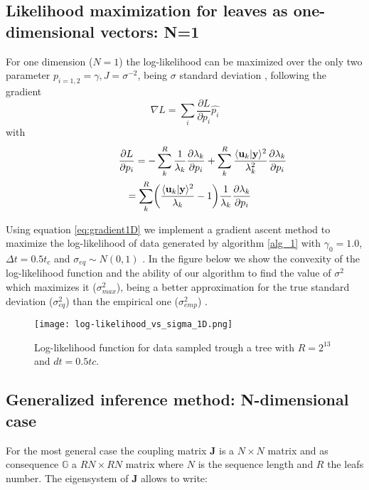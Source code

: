 \documentclass[reprint,amsmath,amssymb,superscriptaddress,showpacs,pre]{revtex4-1}
\let\originalleft\left
\let\originalright\right
\renewcommand{\left}{\mathopen{}\mathclose\bgroup\originalleft}
\renewcommand{\right}{\aftergroup\egroup\originalright}
\begin{document}
\subsection{Likelihood maximization for leaves as  one-dimensional  vectors: N=1}

For one dimension ($N=1$) the log-likelihood can be maximized over the only two parameter  $p_{i=1,2}=\gamma , J = \sigma^{-2}$, being $\sigma$ standard deviation , following the 
gradient
\begin{equation}
\nabla L=\sum_i\frac{\partial L}{\partial p_i}\hat{p_i} 
\end{equation}
with 
\begin{eqnarray}
\nonumber
\label{eq:gradient1D}
\lefteqn{\frac{\partial L}{\partial p_i} = -\sum_{k}^R \frac 1 {\lambda_k} \frac{\partial \lambda_k}{\partial p_i}  +\sum_{k}^R \frac{\langle \mathbf{u}_k | \mathbf{y}\rangle^2}{\lambda_k^2} \frac{\partial \lambda_k}{\partial p_i}} \\ &&= \sum_{k}^R  \left(\frac{\langle \mathbf{u}_k | \mathbf{y}\rangle^2}{\lambda_k} -1 \right) \frac 1 {\lambda_k} \frac{\partial \lambda_k}{\partial p_i}	 
\end{eqnarray}


Using  equation \ref{eq:gradient1D} we implement a gradient ascent method to maximize the log-likelihood of data generated by algorithm \ref{alg_1} with $\gamma_0=1.0$, $\Delta t=0.5 t_c$ and $\sigma_{eq} \sim N(0,1)$ . In the figure below  we show the convexity of the log-likelihood function and the ability of our algorithm to find the value of $ \sigma^2$ which maximizes it ($\sigma^2_{max}$),  being a better approximation for the true  standard deviation ($\sigma^2_{eq}$) than the empirical one ($\sigma^2_{emp}$) .

\begin{figure}[!htb]
	\texttt{[image: log-likelihood\_vs\_sigma\_1D.png]}
\caption{ Log-likelihood function for data sampled trough a tree with $R=2^{13} $ and $dt=0.5tc$.}
\end{figure}


\subsection{Generalized inference method: N-dimensional case}
For the most general case the coupling matrix $\bm J$ is a $N\times N$  matrix and as consequence $\mathbb{G}$ a $RN\times RN$ matrix where $N$ is the sequence length and $R$ the leafs number. 
The eigensystem of $\bm J$ allows to write:
\end{document}
